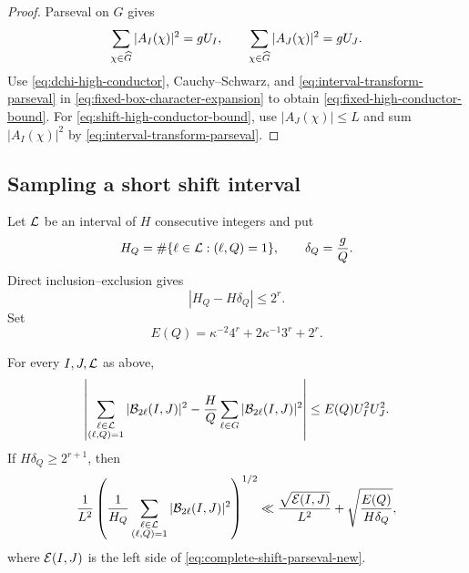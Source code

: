 \begin{proof}
Parseval on $G$ gives
\begin{equation}\label{eq:interval-transform-parseval}
 \sum_{\chi\in\widehat G}|A_I(\chi)|^2=gU_I,
 \qquad
 \sum_{\chi\in\widehat G}|A_J(\chi)|^2=gU_J.
\end{equation}
Use \eqref{eq:dchi-high-conductor}, Cauchy--Schwarz, and \eqref{eq:interval-transform-parseval} in \eqref{eq:fixed-box-character-expansion} to obtain \eqref{eq:fixed-high-conductor-bound}.  For \eqref{eq:shift-high-conductor-bound}, use $|A_J(\chi)|\le L$ and sum $|A_I(\chi)|^2$ by \eqref{eq:interval-transform-parseval}.
\end{proof}

\subsection{Sampling a short shift interval}

Let $\mathcal L$ be an interval of $H$ consecutive integers and put
\begin{equation}\label{eq:H-Q-definitions-new}
 H_Q=\#\{\ell\in\mathcal L:(\ell,Q)=1\},
 \qquad
 \delta_Q=\frac{g}{Q}.
\end{equation}
Direct inclusion--exclusion gives
\begin{equation}\label{eq:H-Q-discrepancy-new}
 |H_Q-H\delta_Q|\le2^r.
\end{equation}
Set
\begin{equation}\label{eq:completion-cost-new}
 E(Q)=\kappa^{-2}4^r+2\kappa^{-1}3^r+2^r.
\end{equation}

\begin{proposition}\label{prop:short-shift-completion-new}
For every $I,J,\mathcal L$ as above,
\begin{align}
 \left|
 \sum_{\substack{\ell\in\mathcal L\\(\ell,Q)=1}}
 |\mathcal B_{2\ell}(I,J)|^2
 -\frac HQ\sum_{\ell\in G}|\mathcal B_{2\ell}(I,J)|^2
 \right|
 \le E(Q)U_I^2U_J^2.
 \label{eq:short-shift-completion-new}
\end{align}
If $H\delta_Q\ge2^{r+1}$, then
\begin{align}
 \frac1{L^2}
 \left(
  \frac1{H_Q}
  \sum_{\substack{\ell\in\mathcal L\\(\ell,Q)=1}}
  |\mathcal B_{2\ell}(I,J)|^2
 \right)^{1/2}
 \ll
 \frac{\sqrt{\mathcal E(I,J)}}{L^2}
 +\sqrt{\frac{E(Q)}{H\delta_Q}},
 \label{eq:short-shift-normalized-transfer}
\end{align}
where $\mathcal E(I,J)$ is the left side of \eqref{eq:complete-shift-parseval-new}.
\end{proposition}


